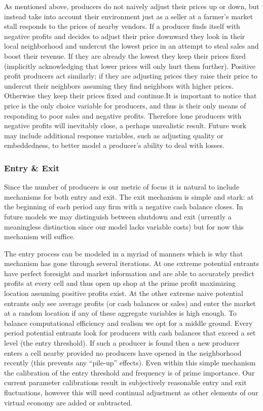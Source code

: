 \documentclass[11pt, oneside]{article}
\begin{document}
As mentioned above, producers do not naively adjust their prices up or down, but instead take into account their environment just as a seller at a farmer's market stall responds to the prices of nearby vendors. If a producer finds itself with negative profits and decides to adjust their price downward they look in their local neighborhood and undercut the lowest price in an attempt to steal sales and boost their revenue. If they are already the lowest they keep their prices fixed (implicitly acknowledging that lower prices will only hurt them further). Positive profit producers act similarly; if they are adjusting prices they raise their price to undercut their neighbors assuming they find neighbors with higher prices. Otherwise they keep their prices fixed and continue.It is important to notice that price is the only choice variable for producers, and thus is their only means of responding to poor sales and negative profits. Therefore lone producers with negative profits will inevitably close, a perhaps unrealistic result. Future work may include additional response variables, such as adjusting quality or embeddedness, to better model a producer's ability to deal with losses.

\subsubsection{Entry \& Exit}
Since the number of producers is our metric of focus it is natural to include mechanisms for both entry and exit. The exit mechanism is simple and stark: at the beginning of each period any firm with a negative cash balance closes. In future models we may distinguish between shutdown and exit (urrently a meaningless distinction since our model lacks variable costs) but for now this mechanism will suffice.

The entry process can be modeled in a myriad of manners which is why that mechanism has gone through several iterations. At one extreme potential entrants have perfect foresight and market information and are able to accurately predict profits at every cell and thus open up shop at the prime profit maximizing location assuming positive profits exist. At the other extreme naive potential entrants only see average profits (or cash balances or sales) and enter the market at a random location if any of these aggregate variables is high enough. To balance computational efficiency and realism we opt for a middle ground. Every period potential entrants look for producers with cash balances that exceed a set level (the entry threshold). If such a producer is found then a new producer enters a cell nearby provided no producers have opened in the neighborhood recently (this prevents any ``pile-up'' effects). Even within this simple mechanism the calibration of the entry threshold and frequency is of prime importance. Our current parameter calibrations result in subjectively reasonable entry and exit fluctuations, however this will need continual adjustment as other elements of our virtual economy are added or subtracted.
\end{document}
